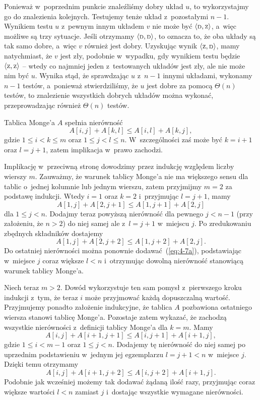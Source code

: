 Ponieważ w~poprzednim punkcie znaleźliśmy dobry układ $u$, to wykorzystajmy go do znalezienia kolejnych. Testujemy tenże układ z~pozostałymi $n-1$. Wynikiem testu $u$ z~pewnym innym układem $v$ nie może być $\langle{\scriptstyle\rm D},{\scriptstyle\rm Z}\rangle$, a~więc możliwe są trzy sytuacje. Jeśli otrzymamy $\langle{\scriptstyle\rm D},{\scriptstyle\rm D}\rangle$, to oznacza to, że oba układy są tak samo dobre, a~więc $v$ również jest dobry. Uzyskując wynik $\langle{\scriptstyle\rm Z},{\scriptstyle\rm D}\rangle$, mamy natychmiast, że $v$ jest zły, podobnie w~wypadku, gdy wynikiem testu będzie $\langle{\scriptstyle\rm Z},{\scriptstyle\rm Z}\rangle$ -- wtedy co najmniej jeden z~testowanych układów jest zły, ale nie może nim być $u$. Wynika stąd, że sprawdzając $u$ z~$n-1$ innymi układami, wykonamy $n-1$ testów, a~ponieważ stwierdziliśmy, że $u$ jest dobre za pomocą $\Theta(n)$ testów, to znalezienie wszystkich dobrych układów można wykonać, przeprowadzając również $\Theta(n)$ testów.


\subproblem %
Tablica Monge'a $A$ spełnia nierówność
\[
	A[i,j]+A[k,l] \le A[i,l]+A[k,j],
\]
gdzie $1\le i<k\le m$ oraz $1\le j<l\le n$. W~szczególności zaś może być $k=i+1$ oraz $l=j+1$, zatem implikacja w~prawo zachodzi.

Implikację w~przeciwną stronę dowodzimy przez indukcję względem liczby wierszy $m$. Zauważmy, że warunek tablicy Monge'a nie ma większego sensu dla tablic o~jednej kolumnie lub jednym wierszu, zatem przyjmijmy $m=2$ za podstawę indukcji. Wtedy $i=1$ oraz $k=2$ i~przyjmując $l=j+1$, mamy
\[
	A[1,j]+A[2,j+1] \le A[1,j+1]+A[2,j] \tag{$*$}\label{eq:4-7a}
\]
dla $1\le j<n$. Dodajmy teraz powyższą nierówność dla pewnego $j<n-1$ (przy założeniu, że $n>2$) do niej samej ale z~$l=j+1$ w~miejscu $j$. Po zredukowaniu zbędnych składników dostajemy
\[
	A[1,j]+A[2,j+2] \le A[1,j+2]+A[2,j].
\]
Do ostatniej nierówności można ponownie dodawać~(\ref{eq:4-7a}), podstawiając w~miejsce $j$ coraz większe $l<n$ i~otrzymując dowolną nierówność stanowiącą warunek tablicy Monge'a.

Niech teraz $m>2$. Dowód wykorzystuje ten sam pomysł z~pierwszego kroku indukcji z~tym, że teraz $i$ może przyjmować każdą dopuszczalną wartość. Przyjmujemy ponadto założenie indukcyjne, że tablica $A$ pozbawiona ostatniego wiersza stanowi tablicę Monge'a. Pozostaje zatem wykazać, że zachodzą wszystkie nierówności z~definicji tablicy Monge'a dla $k=m$. Mamy
\[
	A[i,j]+A[i+1,j+1] \le A[i,j+1]+A[i+1,j],
\]
gdzie $1\le i<m-1$ oraz $1\le j<n$. Dodajemy tę nierówność do niej samej po uprzednim podstawieniu w~jednym jej egzemplarzu $l=j+1<n$ w~miejsce $j$. Dzięki temu otrzymamy
\[
	A[i,j]+A[i+1,j+2] \le A[i,j+2]+A[i+1,j].
\]
Podobnie jak wcześniej możemy tak dodawać żądaną ilość razy, przyjmując coraz większe wartości $l<n$ zamiast $j$ i~dostając wszystkie wymagane nierówności.

